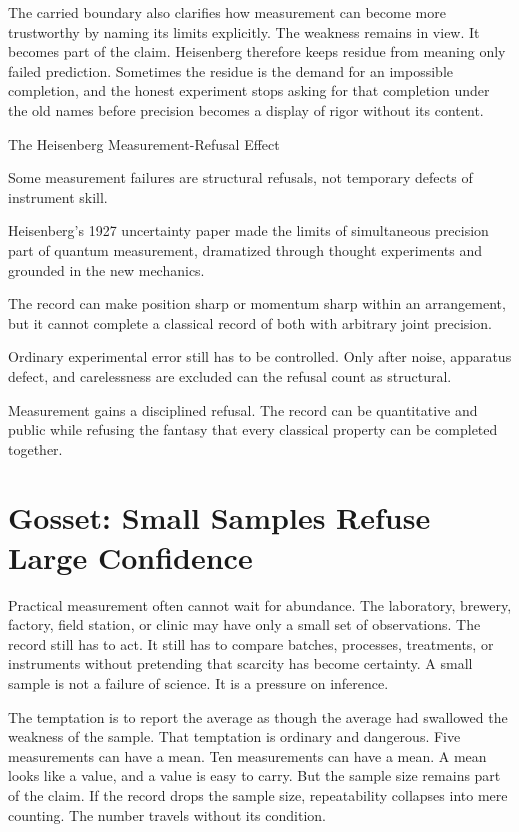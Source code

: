 The carried boundary also clarifies how measurement can become more trustworthy
by naming its limits explicitly. The weakness remains in view. It becomes
part of the claim.
Heisenberg therefore keeps residue from meaning only failed prediction.
Sometimes the residue is the demand for an impossible completion, and the
honest experiment stops asking for that completion under the old names before
precision becomes a display of rigor without its content.

\begin{phenom}{The Heisenberg Measurement-Refusal Effect~\cite{heisenberg1927}}
\label{ph:heisenberg-measurement-refusal}

\PhStatement
Some measurement failures are structural refusals, not temporary defects of
instrument skill.

\PhOrigin
Heisenberg's 1927 uncertainty paper made the limits of simultaneous precision
part of quantum measurement, dramatized through thought experiments and
grounded in the new mechanics.

\PhObservation
The record can make position sharp or momentum sharp within an arrangement,
but it cannot complete a classical record of both with arbitrary joint
precision.

\PhConstraint
Ordinary experimental error still has to be controlled. Only after noise,
apparatus defect, and carelessness are excluded can the refusal count as
structural.

\PhConsequence
Measurement gains a disciplined refusal. The record can be quantitative and
public while refusing the fantasy that every classical property can be
completed together.
\end{phenom}

\section{Gosset: Small Samples Refuse Large Confidence}

Practical measurement often cannot wait for abundance. The laboratory,
brewery, factory, field station, or clinic may have only a small set of
observations. The record still has to act. It still has to compare batches,
processes, treatments, or instruments without pretending that scarcity has
become certainty. A small sample is not a failure of science. It is a pressure on
inference.

The temptation is to report the average as though the average had swallowed
the weakness of the sample. That temptation is ordinary and dangerous. Five
measurements can have a mean. Ten measurements can have a mean. A mean looks
like a value, and a value is easy to carry. But the sample size remains part
of the claim. If the record drops the sample size, repeatability collapses into mere
counting. The number travels without its condition.

